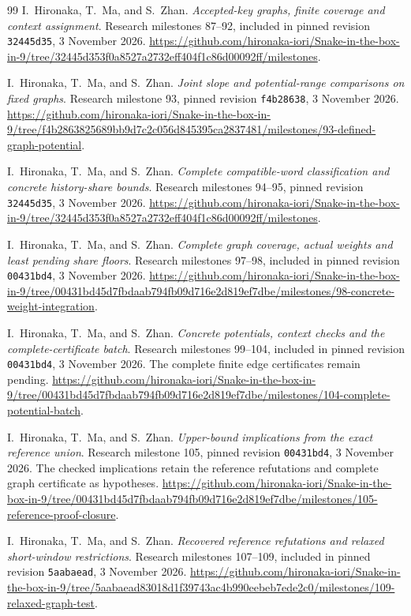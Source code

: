 \documentclass[11pt,a4paper]{article}
\theoremstyle{definition}
\theoremstyle{remark}
\begin{document}
\begin{thebibliography}{99}
I.~Hironaka, T.~Ma, and S.~Zhan. \emph{Accepted-key graphs, finite coverage and context assignment}. Research milestones 87--92, included in pinned revision \texttt{32445d35}, 3 November 2026.
\url{https://github.com/hironaka-iori/Snake-in-the-box-in-9/tree/32445d353f0a8527a2732eff404f1c86d00092ff/milestones}.

I.~Hironaka, T.~Ma, and S.~Zhan. \emph{Joint slope and potential-range comparisons on fixed graphs}. Research milestone 93, pinned revision \texttt{f4b28638}, 3 November 2026.
\url{https://github.com/hironaka-iori/Snake-in-the-box-in-9/tree/f4b2863825689bb9d7c2c056d845395ca2837481/milestones/93-defined-graph-potential}.

I.~Hironaka, T.~Ma, and S.~Zhan. \emph{Complete compatible-word classification and concrete history-share bounds}. Research milestones 94--95, pinned revision \texttt{32445d35}, 3 November 2026.
\url{https://github.com/hironaka-iori/Snake-in-the-box-in-9/tree/32445d353f0a8527a2732eff404f1c86d00092ff/milestones}.

I.~Hironaka, T.~Ma, and S.~Zhan. \emph{Complete graph coverage, actual weights and least pending share floors}. Research milestones 97--98, included in pinned revision \texttt{00431bd4}, 3 November 2026.
\url{https://github.com/hironaka-iori/Snake-in-the-box-in-9/tree/00431bd45d7fbdaab794fb09d716e2d819ef7dbe/milestones/98-concrete-weight-integration}.

I.~Hironaka, T.~Ma, and S.~Zhan. \emph{Concrete potentials, context checks and the complete-certificate batch}. Research milestones 99--104, included in pinned revision \texttt{00431bd4}, 3 November 2026. The complete finite edge certificates remain pending.
\url{https://github.com/hironaka-iori/Snake-in-the-box-in-9/tree/00431bd45d7fbdaab794fb09d716e2d819ef7dbe/milestones/104-complete-potential-batch}.

I.~Hironaka, T.~Ma, and S.~Zhan. \emph{Upper-bound implications from the exact reference union}. Research milestone 105, pinned revision \texttt{00431bd4}, 3 November 2026. The checked implications retain the reference refutations and complete graph certificate as hypotheses.
\url{https://github.com/hironaka-iori/Snake-in-the-box-in-9/tree/00431bd45d7fbdaab794fb09d716e2d819ef7dbe/milestones/105-reference-proof-closure}.

I.~Hironaka, T.~Ma, and S.~Zhan. \emph{Recovered reference refutations and relaxed short-window restrictions}. Research milestones 107--109, included in pinned revision \texttt{5aabaead}, 3 November 2026.
\url{https://github.com/hironaka-iori/Snake-in-the-box-in-9/tree/5aabaead83018d1f39743ac4b990eebeb7ede2c0/milestones/109-relaxed-graph-test}.


\end{thebibliography}
\end{document}
